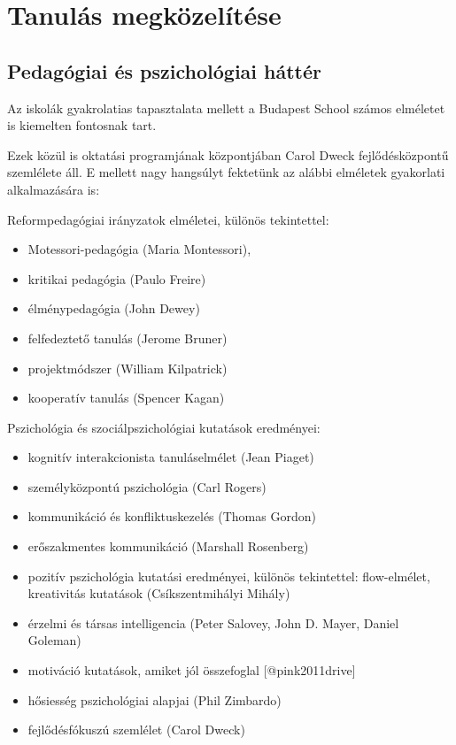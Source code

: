 \hypertarget{tanuluxe1s-megkuxf6zeluxedtuxe9se}{%
\section{Tanulás
megközelítése}\label{tanuluxe1s-megkuxf6zeluxedtuxe9se}}

\hypertarget{pedaguxf3giai-uxe9s-pszicholuxf3giai-huxe1ttuxe9r}{%
\subsection{Pedagógiai és pszichológiai
háttér}\label{pedaguxf3giai-uxe9s-pszicholuxf3giai-huxe1ttuxe9r}}

Az iskolák gyakrolatias tapasztalata mellett a Budapest School számos
elméletet is kiemelten fontosnak tart.

Ezek közül is oktatási programjának központjában Carol Dweck
fejlődésközpontű szemlélete áll. E mellett nagy hangsúlyt fektetünk az
alábbi elméletek gyakorlati alkalmazására is:

Reformpedagógiai irányzatok elméletei, különös tekintettel:

\begin{itemize}
\item
  Motessori-pedagógia (Maria Montessori),
\item
  kritikai pedagógia (Paulo Freire)
\item
  élménypedagógia (John Dewey)
\item
  felfedeztető tanulás (Jerome Bruner)
\item
  projektmódszer (William Kilpatrick)
\item
  kooperatív tanulás (Spencer Kagan)
\end{itemize}

Pszichológia és szociálpszichológiai kutatások eredményei:

\begin{itemize}
\item
  kognitív interakcionista tanuláselmélet (Jean Piaget)
\item
  személyközpontú pszichológia (Carl Rogers)
\item
  kommunikáció és konfliktuskezelés (Thomas Gordon)
\item
  erőszakmentes kommunikáció (Marshall Rosenberg)
\item
  pozitív pszichológia kutatási eredményei, különös tekintettel:
  flow-elmélet, kreativitás kutatások (Csíkszentmihályi Mihály)
\item
  érzelmi és társas intelligencia (Peter Salovey, John D. Mayer, Daniel
  Goleman)
\item
  motiváció kutatások, amiket jól összefoglal {[}@pink2011drive{]}
\item
  hősiesség pszichológiai alapjai (Phil Zimbardo)
\item
  fejlődésfókuszú szemlélet (Carol Dweck)
\end{itemize}

